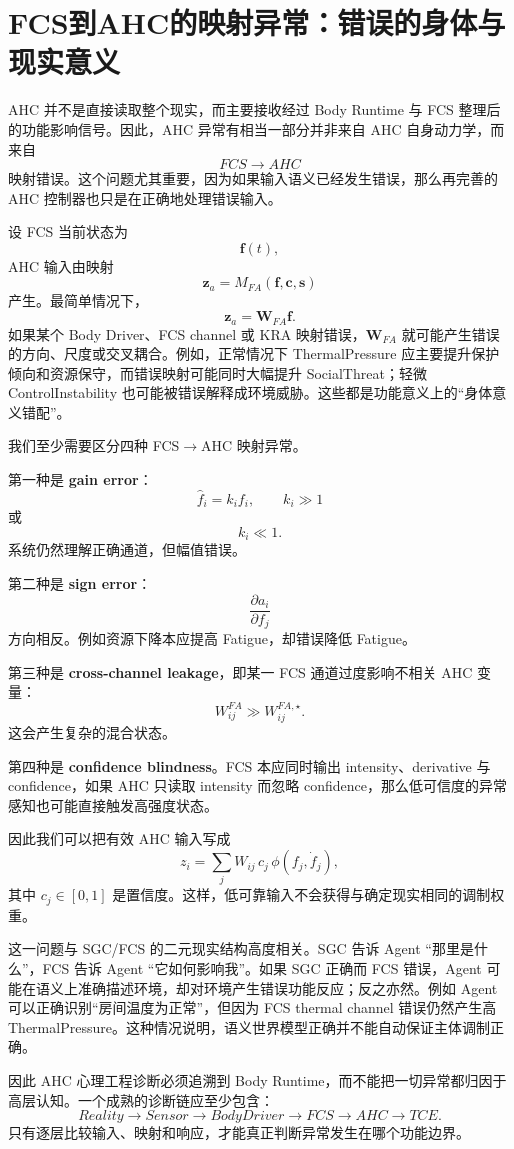 \section{FCS到AHC的映射异常：错误的身体与现实意义}
\label{sec:fcs_ahc_mapping_error}

AHC 并不是直接读取整个现实，而主要接收经过 Body Runtime 与 FCS 整理后的功能影响信号。因此，AHC 异常有相当一部分并非来自 AHC 自身动力学，而来自
\[
FCS
\rightarrow
AHC
\]
映射错误。这个问题尤其重要，因为如果输入语义已经发生错误，那么再完善的 AHC 控制器也只是在正确地处理错误输入。

设 FCS 当前状态为
\[
\mathbf f(t),
\]
AHC 输入由映射
\[
\mathbf z_a
=
M_{FA}
\left(
\mathbf f,
\mathbf c,
\mathbf s
\right)
\]
产生。最简单情况下，
\[
\mathbf z_a
=
\mathbf W_{FA}\mathbf f.
\]
如果某个 Body Driver、FCS channel 或 KRA 映射错误，$\mathbf W_{FA}$ 就可能产生错误的方向、尺度或交叉耦合。例如，正常情况下 ThermalPressure 应主要提升保护倾向和资源保守，而错误映射可能同时大幅提升 SocialThreat；轻微 ControlInstability 也可能被错误解释成环境威胁。这些都是功能意义上的“身体意义错配”。

我们至少需要区分四种 FCS$\rightarrow$AHC 映射异常。

第一种是 \textbf{gain error}：
\[
\hat f_i
=
k_i f_i,
\qquad
k_i\gg1
\]
或
\[
k_i\ll1.
\]
系统仍然理解正确通道，但幅值错误。

第二种是 \textbf{sign error}：
\[
\frac{\partial a_i}{\partial f_j}
\]
方向相反。例如资源下降本应提高 Fatigue，却错误降低 Fatigue。

第三种是 \textbf{cross-channel leakage}，即某一 FCS 通道过度影响不相关 AHC 变量：
\[
W_{ij}^{FA}
\gg
W_{ij}^{FA,\star}.
\]
这会产生复杂的混合状态。

第四种是 \textbf{confidence blindness}。FCS 本应同时输出 intensity、derivative 与 confidence，如果 AHC 只读取 intensity 而忽略 confidence，那么低可信度的异常感知也可能直接触发高强度状态。

因此我们可以把有效 AHC 输入写成
\[
z_i
=
\sum_j
W_{ij}
\,c_j\,
\phi(f_j,\dot f_j),
\]
其中 $c_j\in[0,1]$ 是置信度。这样，低可靠输入不会获得与确定现实相同的调制权重。

这一问题与 SGC/FCS 的二元现实结构高度相关。SGC 告诉 Agent “那里是什么”，FCS 告诉 Agent “它如何影响我”。如果 SGC 正确而 FCS 错误，Agent 可能在语义上准确描述环境，却对环境产生错误功能反应；反之亦然。例如 Agent 可以正确识别“房间温度为正常”，但因为 FCS thermal channel 错误仍然产生高 ThermalPressure。这种情况说明，语义世界模型正确并不能自动保证主体调制正确。

因此 AHC 心理工程诊断必须追溯到 Body Runtime，而不能把一切异常都归因于高层认知。一个成熟的诊断链应至少包含：
\[
Reality
\rightarrow
Sensor
\rightarrow
BodyDriver
\rightarrow
FCS
\rightarrow
AHC
\rightarrow
TCE.
\]
只有逐层比较输入、映射和响应，才能真正判断异常发生在哪个功能边界。

